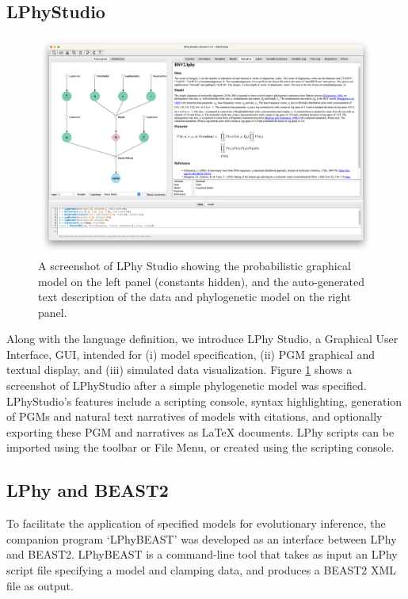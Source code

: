 \documentclass[10pt,letterpaper,table]{article}
\theoremstyle{definition}
\begin{document}
\subsection{LPhyStudio} 
\begin{figure}[!h]
  \includegraphics[width=\textwidth]{figs_plos/RSV2.png}
  \caption{A screenshot of LPhy Studio showing the probabilistic graphical model 
  on the left panel (constants hidden), and the auto-generated text description of the data and phylogenetic model on the right panel.} 
  \label{fig:lphystudio}
\end{figure}
Along with the language definition, we introduce LPhy Studio, a Graphical User Interface, GUI, intended for (i) model specification, (ii) PGM graphical and textual display, and (iii) simulated data visualization.
Figure \ref{fig:lphystudio} shows a screenshot of LPhyStudio after a simple phylogenetic model was specified. 
LPhyStudio's features include a scripting console, syntax highlighting, generation of PGMs and natural text narratives of models with citations, and optionally exporting these PGM and narratives as LaTeX documents. 
LPhy scripts can be imported using the toolbar or File Menu, or created using the scripting console. 

\subsection{LPhy and BEAST2}
\label{sec:lphybeast}
To facilitate the application of specified models for evolutionary inference, the companion program `LPhyBEAST' was developed as an interface between LPhy and BEAST2.
LPhyBEAST is a command-line tool that takes as input an LPhy script file specifying a model and clamping data, and produces a BEAST2 XML file as output.
\end{document}
